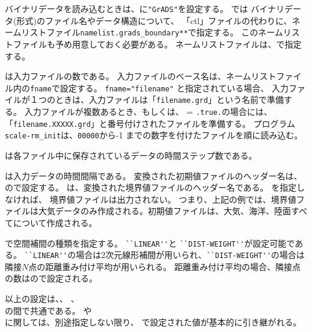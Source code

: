 バイナリデータを読み込むときは、に\verb|"GrADS"|を設定する。
\scalerm では バイナリデータ({\grads}形式)のファイル名やデータ構造について、
「ctl」ファイルの代わりに、ネームリストファイル\verb|namelist.grads_boundary**|で指定する。
このネームリストファイルも予め用意しておく必要がある。
ネームリストファイルは、で指定する。


は入力ファイルの数である。
入力ファイルのベース名は、ネームリストファイル内の\verb|fname|で設定する。
\verb|fname="filename"| と指定されている場合、
入力ファイルが１つのときは、入力ファイルは「\verb|filename.grd|」という名前で準備する。
入力ファイルが複数あるとき、もしくは、 = \verb|.true.|の場合には、
「\verb|filename.XXXXX.grd|」と番号付けされたファイルを準備する。
プログラム\verb|scale-rm_init|は、\verb|00000|から-1 までの数字を付けたファイルを順に読み込む。

は各ファイル中に保存されているデータの時間ステップ数である。

は入力データの時間間隔である。
変換された初期値ファイルのヘッダー名は、ので設定する。
は、変換された境界値ファイルのヘッダー名である。
を指定しなければ、 境界値ファイルは出力されない。
つまり、上記の例では、境界値ファイルは大気データのみ作成される。初期値ファイルは、大気、海洋、陸面すべてについて作成される。


で空間補間の種類を指定する。
\verb|``LINEAR''|と \verb|``DIST-WEIGHT''|が設定可能である。
\verb|``LINEAR''|の場合は2次元線形補間が用いられ、\verb|``DIST-WEIGHT''|の場合は隣接$N$点の距離重み付け平均が用いられる。
距離重み付け平均の場合、隣接点の数はので設定される。

以上の設定は、、
、\\
の間で共通である。
や \\
に関しては、別途指定しない限り、
で設定された値が基本的に引き継がれる。
%

